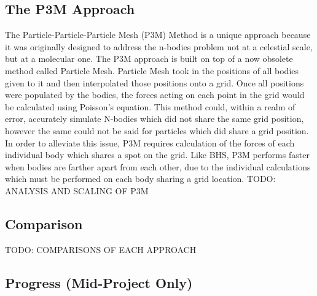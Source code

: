 \documentclass[11pt]{article}
\begin{document}
\begin{center}
\section*{The P3M Approach}
\end{center}
The Particle-Particle-Particle Mesh (P3M) Method is a unique approach because it was originally designed to address the n-bodies problem not at a celestial scale, but at a molecular one. The P3M approach is built on top of a now obsolete method called Particle Mesh.
\newline \newline
Particle Mesh took in the positions of all bodies given to it and then interpolated those positions onto a grid. Once all positions were populated by the bodies, the forces acting on each point in the grid would be calculated using Poisson's equation. This method could, within a realm of error, accurately simulate N-bodies which did not share the same grid position, however the same could not be said for particles which did share a grid position.
\newline \newline
In order to alleviate this issue, P3M requires calculation of the forces of each individual body which shares a spot on the grid. Like BHS, P3M performs faster when bodies are farther apart from each other, due to the individual calculations which must be performed on each body sharing a grid location.
\newline \newline
TODO: ANALYSIS AND SCALING OF P3M

\begin{center}
\section*{Comparison}
\end{center}
TODO: COMPARISONS OF EACH APPROACH
\begin{center}
\section*{Progress (Mid-Project Only)}
\end{center}
\end{document}
